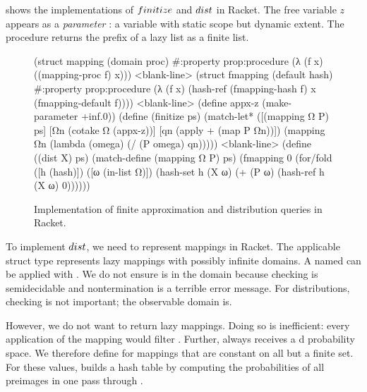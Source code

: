  shows the implementations of $finitize$ and $dist$ in Racket. The free variable $z$ appears as a \textit{parameter} : a variable with static scope but dynamic extent. The  procedure returns the prefix of a lazy list as a finite list.


\begin{figure}[tb]
\centering
\begin{schemedisplay}
(struct mapping (domain proc)
  #:property prop:procedure (λ (f x) ((mapping-proc f) x)))
<blank-line>
(struct fmapping (default hash)
  #:property prop:procedure
  (λ (f x) (hash-ref (fmapping-hash f) x (fmapping-default f))))
<blank-line>
(define appx-z (make-parameter +inf.0))
(define (finitize ps)
  (match-let* ([(mapping Ω P)  ps]
               [Ωn  (cotake Ω (appx-z))]
               [qn  (apply + (map P Ωn))])
    (mapping Ωn (lambda (omega) (/ (P omega) qn)))))
<blank-line>
(define ((dist X) ps)
  (match-define (mapping Ω P) ps)
  (fmapping 0 (for/fold ([h  (hash)]) ([ω  (in-list Ω)])
                (hash-set h (X ω) (+ (P ω) (hash-ref h (X ω) 0))))))
\end{schemedisplay}
\vspace{-\belowcodeskip}  %
\hrulefill
\caption[Implementation of finite approximation and distribution queries]{Implementation of finite approximation and distribution queries in Racket.}
\label{fig:dist-impl}
\end{figure}

To implement $dist$, we need to represent mappings in Racket. The applicable struct type  represents lazy mappings with possibly infinite domains. A  named  can be applied with . We do not ensure  is in the domain because checking is semidecidable and nontermination is a terrible error message. For distributions, checking is not important; the observable domain is.

However, we do not want  to return lazy mappings. Doing so is inefficient: every application of the mapping would filter . Further,  always receives a d probability space. We therefore define  for mappings that are constant on all but a finite set. For these values,  builds a hash table by computing the probabilities of all preimages in one pass through .

